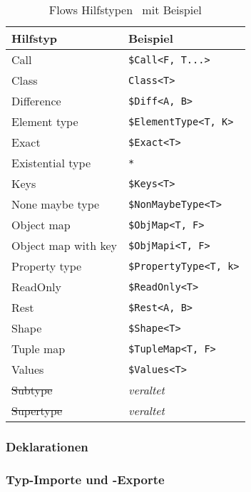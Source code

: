 \begin{table}
  \begin{tabularx}{\textwidth}{@{}ll@{}}
    \midrule
    \textbf{Hilfstyp}   & \textbf{Beispiel}               \\
    \midrule
    Call                & \texttt{\$Call<F, T...>}        \\
    Class               & \texttt{Class<T>}               \\
    Difference          & \texttt{\$Diff<A, B>}           \\
    Element type        & \texttt{\$ElementType<T, K>}    \\
    Exact               & \texttt{\$Exact<T>}             \\
    Existential type    & \texttt{*}                      \\
    Keys                & \texttt{\$Keys<T>}              \\
    None maybe type     & \texttt{\$NonMaybeType<T>}      \\
    Object map          & \texttt{\$ObjMap<T, F>}         \\
    Object map with key & \texttt{\$ObjMapi<T, F>}        \\
    Property type       & \texttt{\$PropertyType<T, k>}   \\
    ReadOnly            & \texttt{\$ReadOnly<T>}          \\
    Rest                & \texttt{\$Rest<A, B>}           \\
    Shape               & \texttt{\$Shape<T>}             \\
    Tuple map           & \texttt{\$TupleMap<T, F>}       \\
    Values              & \texttt{\$Values<T>}            \\
    \sout{Subtype}      & \textit{veraltet}               \\
    \sout{Supertype}    & \textit{veraltet}               \\
    \midrule
  \end{tabularx}
  \caption{Flows Hilfstypen~\autocite{FLOW_UTILITY_TYPES} mit Beispiel}
  \label{tab:flow-utility-types}
\end{table}

\subsubsection{Deklarationen}

\subsubsection{Typ-Importe und -Exporte}

